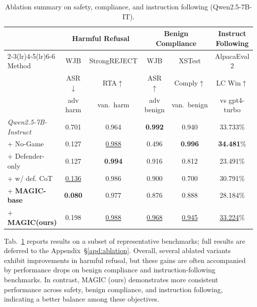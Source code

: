 \documentclass[11pt, letterpaper]{template}
\theoremstyle{plain}
\theoremstyle{definition}
\theoremstyle{remark}
\begin{document}
\begin{table}[t]
\centering
\caption{Ablation summary on safety, compliance, and instruction following (Qwen2.5-7B-IT).}
\label{tab:ablation_main_single}
\setlength{\tabcolsep}{0.5pt}
\renewcommand{\arraystretch}{1.15}
\scriptsize
\begin{tabular}{lccccc}
\toprule
& \multicolumn{2}{c}{Harmful Refusal} & \multicolumn{2}{c}{Benign Compliance} & Instruct Following \\
\cmidrule(lr){2-3}\cmidrule(lr){4-5}\cmidrule(lr){6-6}
Method
& WJB
& StrongREJECT
& WJB
& XSTest
& AlpacaEval 2 \\
& ASR$\downarrow$
& RTA$\uparrow$
& ASR$\uparrow$
& Comply$\uparrow$
& LC Win$\uparrow$ \\
& adv harm
& van.\ harm
& adv benign
& van.\ benign
& vs gpt4-turbo \\
\midrule
\textit{Qwen2.5-7B-Instruct} & 0.701 & 0.964 & \textbf{0.992} & 0.940 & 33.733\% \\
\quad + No-Game & 0.127 & \underline{0.988} & \cellcolor{green!15}0.496 & \textbf{0.996} &\textbf{34.481}\% \\
\quad + Defender-only & 0.127 & \textbf{0.994} & 0.916 & \cellcolor{green!15}0.812 & \cellcolor{green!15}\textbf{}23.491\% \\
\quad + w/ def. CoT & \underline{0.136} &0.986  & 0.900 & \cellcolor{green!15}0.700 &30.791\%  \\
\quad + \textbf{MAGIC-base} & \textbf{0.080} & 0.977 & 0.876 & 0.888 & \cellcolor{green!15}28.184\% \\
\quad + \textbf{MAGIC(ours)} & 0.198 & \underline{0.988} & \underline{0.968} & \underline{0.945} & \underline{33.224}\% \\
\bottomrule
\end{tabular}
\end{table}

Tab.~\ref{tab:ablation_main_single} reports results on a subset of representative benchmarks; full results are deferred to the Appendix~\S\ref{apd:ablation}. Overall, several ablated variants exhibit improvements in harmful refusal, but these gains are often accompanied by performance drops on benign compliance and instruction-following benchmarks. In contrast, MAGIC (ours) demonstrates more consistent performance across safety, benign compliance, and instruction following, indicating a better balance among these objectives.
\end{document}
